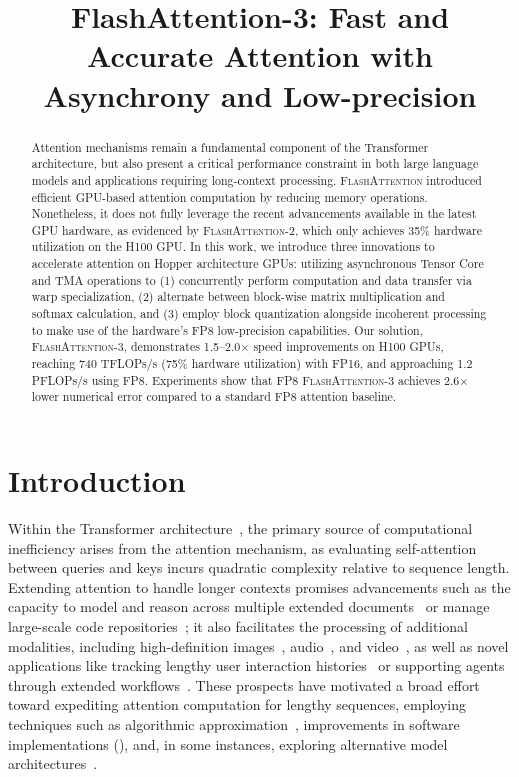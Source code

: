 \title{FlashAttention-3: Fast and Accurate Attention with Asynchrony and Low-precision}

\begin{abstract}
Attention mechanisms remain a fundamental component of the Transformer architecture, but also present a critical performance constraint in both large language models and applications requiring long-context processing. \textsc{FlashAttention} introduced efficient GPU-based attention computation by reducing memory operations. Nonetheless, it does not fully leverage the recent advancements available in the latest GPU hardware, as evidenced by \textsc{FlashAttention-2}, which only achieves 35\% hardware utilization on the H100 GPU. In this work, we introduce three innovations to accelerate attention on Hopper architecture GPUs: utilizing asynchronous Tensor Core and TMA operations to (1) concurrently perform computation and data transfer via warp specialization, (2) alternate between block-wise matrix multiplication and softmax calculation, and (3) employ block quantization alongside incoherent processing to make use of the hardware's FP8 low-precision capabilities. Our solution, \textsc{FlashAttention-3}, demonstrates 1.5--2.0$\times$ speed improvements on H100 GPUs, reaching 740 TFLOPs/s (75\% hardware utilization) with FP16, and approaching 1.2 PFLOPs/s using FP8. Experiments show that FP8 \textsc{FlashAttention-3} achieves 2.6$\times$ lower numerical error compared to a standard FP8 attention baseline.
\end{abstract}

\section{Introduction}
\label{sec:intro}

Within the Transformer architecture~\citep{vaswani2017attention}, the primary source of computational inefficiency arises from the attention mechanism, as evaluating self-attention between queries and keys incurs quadratic complexity relative to sequence length. Extending attention to handle longer contexts promises advancements such as the capacity to model and reason across multiple extended documents~\citep{guo2021longt5,shaham2022scrolls,peng2023yarn} or manage large-scale code repositories~\citep{roziere2023code, li2023starcoder}; it also facilitates the processing of additional modalities, including high-definition images~\citep{chen2022scaling}, audio~\citep{gulati2020conformer}, and video~\citep{ho2022video}, as well as novel applications like tracking lengthy user interaction histories~\citep{sun2019bert4rec} or supporting agents through extended workflows~\citep{yao2022react}. These prospects have motivated a broad effort toward expediting attention computation for lengthy sequences, employing techniques such as algorithmic approximation~\citep{katharopoulos2020transformers,choromanski2020rethinking,
tay2020efficient}, improvements in software implementations (\citep{rabe2021self,dao2022flashattention,kwon2023efficient}), and, in some instances, exploring alternative model architectures~\citep{peng2023rwkv,sun2023retentive,gu2023mamba}.

